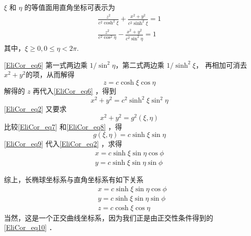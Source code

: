 $\xi$ 和 $\eta$ 的等值面用直角坐标可表示为
\begin{equation}\label{EliCor_eq6}
\begin{aligned}
\frac{z^2}{c^2\cosh^2\xi}+\frac{x^2+y^2}{c^2\sinh^2\xi}=1\\
\frac{z^2}{c^2\cos^2\eta}-\frac{x^2+y^2}{c^2\sin^2\eta}=1
\end{aligned}
\end{equation}
其中，$\xi\geq 0,0\leq\eta<2\pi$.

\autoref{EliCor_eq6} 第一式两边乘 $1/\sin^2\eta$，第二式两边乘 $1/\sinh^2\xi$， 再相加可消去$x^2+y^2$的项，从而解得
\begin{equation}
z=c\cosh\xi\cos\eta
\end{equation}
 解得的 $z$ 再代入\autoref{EliCor_eq6} ，得到
 \begin{equation}\label{EliCor_eq7}
 x^2+y^2=c^2\sinh^2\xi\sin^2\eta
 \end{equation}
 \autoref{EliCor_eq2} 又要求
 \begin{equation}\label{EliCor_eq8}
 x^2+y^2=g^2(\xi,\eta)
 \end{equation}
 比较\autoref{EliCor_eq7} 和\autoref{EliCor_eq8} ，得
 \begin{equation}\label{EliCor_eq9}
 g(\xi,\eta)=c\sinh\xi\sin\eta
 \end{equation}
 \autoref{EliCor_eq9} 代入\autoref{EliCor_eq2} ，求得
 \begin{equation}
 \begin{aligned}
 x=c\sinh\xi\sin\eta\cos\phi\\
y=c\sinh\xi\sin\eta\sin\phi
 \end{aligned}
 \end{equation}
 
 综上，长椭球坐标系与直角坐标系有如下关系
 \begin{equation}\label{EliCor_eq10}
 \begin{aligned}
 &x=c\sinh\xi\sin\eta\cos\phi\\
&y=c\sinh\xi\sin\eta\sin\phi\\
&z=c\cosh\xi\cos\eta
 \end{aligned}
 \end{equation}
 当然，这是一个正交曲线坐标系，因为我们正是由正交性条件得到的\autoref{EliCor_eq10} ．



